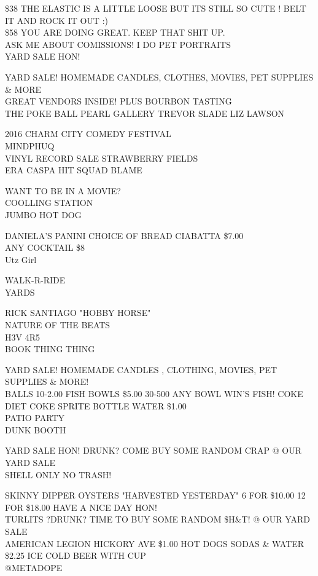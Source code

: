 \documentclass[10pt,letterpaper]{article}
\begin{document}
\$38 THE ELASTIC IS A LITTLE LOOSE BUT ITS STILL SO CUTE !  BELT IT AND ROCK IT OUT :)\\
\$58 YOU ARE DOING GREAT.  KEEP THAT SHIT UP.\\
ASK ME ABOUT COMISSIONS!  I DO PET PORTRAITS\\
YARD SALE HON!

YARD SALE!  HOMEMADE CANDLES, CLOTHES, MOVIES, PET SUPPLIES \& MORE\\
GREAT VENDORS INSIDE!  PLUS BOURBON TASTING\\
THE POKE BALL PEARL GALLERY TREVOR SLADE LIZ LAWSON

2016 CHARM CITY COMEDY FESTIVAL\\
MINDPHUQ\\
VINYL RECORD SALE STRAWBERRY FIELDS\\
ERA CASPA HIT SQUAD BLAME

WANT TO BE IN A MOVIE?\\
COOLLING STATION\\
JUMBO HOT DOG

DANIELA'S PANINI CHOICE OF BREAD CIABATTA \$7.00\\
ANY COCKTAIL \$8\\
Utz Girl

WALK{-}R{-}RIDE\\
YARDS

RICK SANTIAGO "HOBBY HORSE"\\
NATURE OF THE BEATS\\
H3V 4R5\\
BOOK THING THING

YARD SALE! HOMEMADE CANDLES , CLOTHING, MOVIES, PET SUPPLIES \& MORE!\\
BALLS 10{-}2.00 FISH BOWLS \$5.00 30{-}500 ANY BOWL WIN'S FISH!  COKE DIET COKE SPRITE BOTTLE WATER \$1.00\\
PATIO PARTY\\
DUNK BOOTH

YARD SALE HON!  DRUNK?  COME BUY SOME RANDOM CRAP @ OUR YARD SALE\\
SHELL ONLY NO TRASH!

SKINNY DIPPER OYSTERS "HARVESTED YESTERDAY" 6 FOR \$10.00 12 FOR \$18.00 HAVE A NICE DAY HON!\\
TURLITS ?DRUNK? TIME TO BUY SOME RANDOM \$H\&T! @ OUR YARD SALE\\
AMERICAN LEGION HICKORY AVE \$1.00 HOT DOGS SODAS \& WATER \$2.25 ICE COLD BEER WITH CUP\\
@METADOPE
\end{document}

